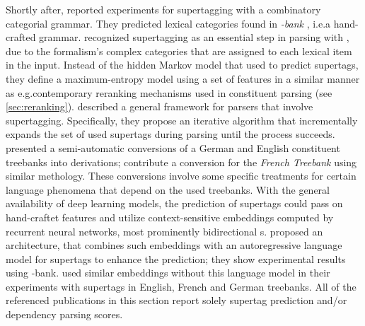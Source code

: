 \documentclass[../document.tex]{subfiles}
\begin{document}
    Shortly after, \citet{clark2002supertagging} reported experiments for supertagging with a combinatory categorial grammar.
    They predicted lexical categories found in \emph{-bank} \citep{Hoc07}, i.e.\@ a hand-crafted grammar.   
    \citet{Clark04} recognized supertagging as an essential step in parsing with , due to the formalism's complex categories that are assigned to each lexical item in the input.
    Instead of the hidden Markov model that \citet{bangalore1999supertagging} used to predict supertags, they define a maximum-entropy model using a set of features in a similar manner as e.g.\@ contemporary reranking mechanisms used in constituent parsing (see \cref{sec:reranking}).
    \citet{Auli12} described a general framework for parsers that involve supertagging.
    Specifically, they propose an iterative algorithm that incrementally expands the set of used supertags during parsing until the process succeeds.
    \citet{kaeshammer2012german,Kaeshammer2012GermanAE} presented a semi-automatic conversions of a German and English constituent treebanks into  derivations; \citet{Bla18} contribute a conversion for the \emph{French Treebank} \citep{abeille2003building} using similar methology.
    These conversions involve some specific treatments for certain language phenomena that depend on the used treebanks.
    With the general availability of deep learning models, the prediction of supertags could pass on hand-craftet features and utilize context-sensitive embeddings computed by recurrent neural networks, most prominently bidirectional s.
    \citet{vaswani2016supertagging} proposed an architecture, that combines such embeddings with an autoregressive language model for supertags to enhance the prediction; they show experimental results using -bank.
    \citet{Kas17,Bla18} used similar embeddings without this language model in their experiments with  supertags in English, French and German treebanks.
    All of the referenced publications in this section report solely supertag prediction and/or dependency parsing scores.

    \ifSubfilesClassLoaded{%
        \printindex
    }{}
\end{document}
